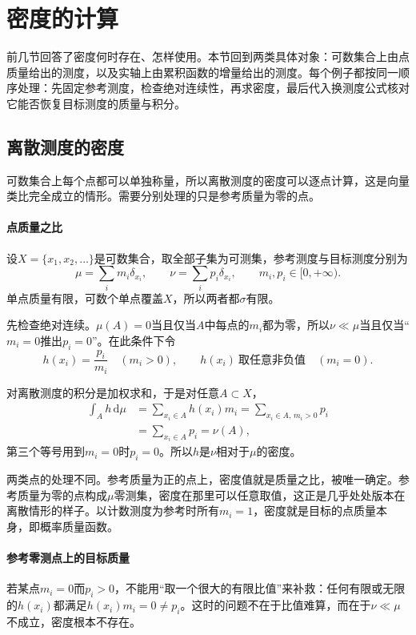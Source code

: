 \section{密度的计算}
\label{sec:dens-computation}

前几节回答了密度何时存在、怎样使用。本节回到两类具体对象：可数集合上由点质量给出的测度，以及实轴上由累积函数的增量给出的测度。每个例子都按同一顺序处理：先固定参考测度，检查绝对连续性，再求密度，最后代入换测度公式核对它能否恢复目标测度的质量与积分。

\subsection{离散测度的密度}
\label{sec:dens-discrete}

可数集合上每个点都可以单独称量，所以离散测度的密度可以逐点计算，这是向量类比完全成立的情形。需要分别处理的只是参考质量为零的点。

\paragraph{点质量之比}
设$X=\{x_1,x_2,\ldots\}$是可数集合，取全部子集为可测集，参考测度与目标测度分别为
\[
\mu=\sum_im_i\delta_{x_i},\qquad\nu=\sum_ip_i\delta_{x_i},\qquad m_i,p_i\in[0,+\infty).
\]
单点质量有限，可数个单点覆盖$X$，所以两者都$\sigma$有限。

先检查绝对连续。$\mu(A)=0$当且仅当$A$中每点的$m_i$都为零，所以$\nu\ll\mu$当且仅当“$m_i=0$推出$p_i=0$”。在此条件下令
\begin{equation}
h(x_i)=\frac{p_i}{m_i}\quad(m_i>0),\qquad h(x_i)\ \text{取任意非负值}\quad(m_i=0).
\label{eq:dens-discrete}
\end{equation}

对离散测度的积分是加权求和，于是对任意$A\subset X$，
\[
\begin{aligned}
\int_Ah\,\mathrm d\mu&=\sum_{x_i\in A}h(x_i)m_i=\sum_{x_i\in A,\,m_i>0}p_i\\
&=\sum_{x_i\in A}p_i=\nu(A),
\end{aligned}
\]
第三个等号用到$m_i=0$时$p_i=0$。所以$h$是$\nu$相对于$\mu$的密度。

两类点的处理不同。参考质量为正的点上，密度值就是质量之比，被唯一确定。参考质量为零的点构成$\mu$零测集，密度在那里可以任意取值，这正是几乎处处版本在离散情形的样子。以计数测度为参考时所有$m_i=1$，密度就是目标的点质量本身，即概率质量函数。

\paragraph{参考零测点上的目标质量}
若某点$m_i=0$而$p_i>0$，不能用“取一个很大的有限比值”来补救：任何有限或无限的$h(x_i)$都满足$h(x_i)m_i=0\neq p_i$。这时的问题不在于比值难算，而在于$\nu\ll\mu$不成立，密度根本不存在。

